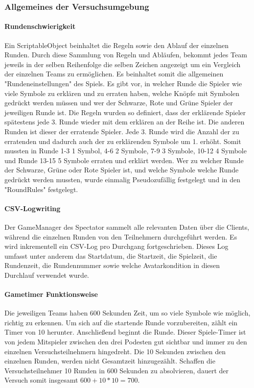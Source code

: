 \documentclass[a4paper,11pt]{article}%
\renewcommand{\\}{\vspace*{0.5\baselineskip} \newline}
\begin{document}
\subsubsection{Allgemeines der Versuchsumgebung}

\paragraph{Rundenschwierigkeit}
Ein ScriptableObject beinhaltet die Regeln sowie den Ablauf der einzelnen Runden. 
Durch diese Sammlung von Regeln und Abläufen, bekommt jedes Team jeweils in der selben Reihenfolge die selben Zeichen angezeigt um ein Vergleich der einzelnen Teams zu ermöglichen. Es beinhaltet somit die allgemeinen "Rundeneinstellungen" des Spiels. Es gibt vor, in welcher Runde die Spieler wie viele Symbole zu erklären und zu erraten haben, welche Knöpfe mit Symbolen gedrückt werden müssen und wer der Schwarze, Rote und Grüne Spieler der jeweiligen Runde ist. Die Regeln wurden so definiert, dass der erklärende Spieler spätestens jede 3. Runde wieder mit dem erklären an der Reihe ist. Die anderen Runden ist dieser der erratende Spieler. Jede 3. Runde wird die Anzahl der zu erratenden und dadurch auch der zu erklärenden Symbole um 1. erhöht. Somit mussten in Runde 1-3 1 Symbol, 4-6 2 Symbole, 7-9 3 Symbole, 10-12 4 Symbole und Runde 13-15 5 Symbole erraten und erklärt werden.
Wer zu welcher Runde der Schwarze, Grüne oder Rote Spieler ist, und welche Symbole welche Runde gedrückt werden mussten, wurde einmalig Pseudozufällig festgelegt und in den "RoundRules" festgelegt.

\paragraph{CSV-Logwriting}
Der GameManager des Spectator sammelt alle relevanten Daten über die Clients, während die einzelnen Runden von den Teilnehmern durchgeführt werden. Es wird inkrementell ein CSV-Log pro Durchgang fortgeschrieben. Dieses Log umfasst unter anderem das Startdatum, die Startzeit, die Spielzeit, die Rundenzeit, die Rundennummer %
sowie welche Avatarkondition in diesen Durchlauf verwendet wurde.

\paragraph{Gametimer Funktionsweise}
Die jeweiligen Teams haben 600 Sekunden Zeit, um so viele Symbole wie möglich, richtig zu erkennen. Um sich auf die startende Runde vorzubereiten, zählt ein Timer von 10 herunter. Anschließend beginnt die Runde. Dieser Spiele-Timer ist von jedem Mitspieler zwischen den drei Podesten gut sichtbar und immer zu den einzelnen Versuchsteilnehmern hingedreht. Die 10 Sekunden zwischen den einzelnen Runden, werden nicht Gesamtzeit hinzugezählt. Schaffen die Versuchsteilnehmer 10 Runden in 600 Sekunden zu absolvieren, dauert der Versuch somit insgesamt \\
$600 + 10 * 10 = 700$.
\end{document}
